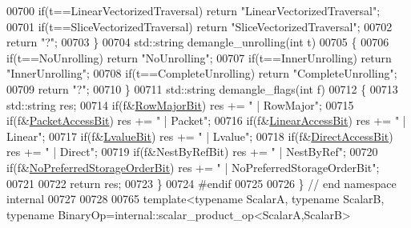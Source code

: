 \begin{DoxyCode}
{00700   \textcolor{keywordflow}{if}(t==LinearVectorizedTraversal) \textcolor{keywordflow}{return} \textcolor{stringliteral}{"LinearVectorizedTraversal"};
00701   \textcolor{keywordflow}{if}(t==SliceVectorizedTraversal) \textcolor{keywordflow}{return} \textcolor{stringliteral}{"SliceVectorizedTraversal"};
00702   \textcolor{keywordflow}{return} \textcolor{stringliteral}{"?"};
00703 \}
00704 std::string demangle\_unrolling(\textcolor{keywordtype}{int} t)
00705 \{
00706   \textcolor{keywordflow}{if}(t==NoUnrolling) \textcolor{keywordflow}{return} \textcolor{stringliteral}{"NoUnrolling"};
00707   \textcolor{keywordflow}{if}(t==InnerUnrolling) \textcolor{keywordflow}{return} \textcolor{stringliteral}{"InnerUnrolling"};
00708   \textcolor{keywordflow}{if}(t==CompleteUnrolling) \textcolor{keywordflow}{return} \textcolor{stringliteral}{"CompleteUnrolling"};
00709   \textcolor{keywordflow}{return} \textcolor{stringliteral}{"?"};
00710 \}
00711 std::string demangle\_flags(\textcolor{keywordtype}{int} f)
00712 \{
00713   std::string res;
00714   \textcolor{keywordflow}{if}(f&\hyperlink{group__flags_gae4f56c2a60bbe4bd2e44c5b19cbe8762}{RowMajorBit})                 res += \textcolor{stringliteral}{" | RowMajor"};
00715   \textcolor{keywordflow}{if}(f&\hyperlink{group__flags_ga1a306a438e1ab074e8be59512e887b9f}{PacketAccessBit})             res += \textcolor{stringliteral}{" | Packet"};
00716   \textcolor{keywordflow}{if}(f&\hyperlink{group__flags_ga4b983a15d57cd55806df618ac544d09e}{LinearAccessBit})             res += \textcolor{stringliteral}{" | Linear"};
00717   \textcolor{keywordflow}{if}(f&\hyperlink{group__flags_gae2c323957f20dfdc6cb8f44428eaec1a}{LvalueBit})                   res += \textcolor{stringliteral}{" | Lvalue"};
00718   \textcolor{keywordflow}{if}(f&\hyperlink{group__flags_gabf1e9d0516a933445a4c307ad8f14915}{DirectAccessBit})             res += \textcolor{stringliteral}{" | Direct"};
00719   \textcolor{keywordflow}{if}(f&NestByRefBit)                res += \textcolor{stringliteral}{" | NestByRef"};
00720   \textcolor{keywordflow}{if}(f&\hyperlink{group__flags_ga3c186ad80ddcf5e2ed3d7ee31cca1860}{NoPreferredStorageOrderBit})  res += \textcolor{stringliteral}{" | NoPreferredStorageOrderBit"};
00721   
00722   \textcolor{keywordflow}{return} res;
00723 \}
00724 \textcolor{preprocessor}{#endif}
00725 
00726 \} \textcolor{comment}{// end namespace internal}
00727 
00728 
00765 \textcolor{keyword}{template}<\textcolor{keyword}{typename} ScalarA, \textcolor{keyword}{typename} ScalarB, \textcolor{keyword}{typename} BinaryOp=\textcolor{keywordtype}{int}ernal::scalar\_product\_op<ScalarA,ScalarB>
}
\end{DoxyCode}
